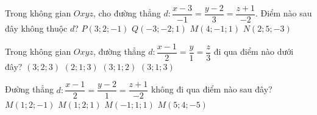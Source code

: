 \begin{ex}%
	Trong không gian $Oxyz$, cho đường thẳng $d\colon \dfrac{x-3}{-1}=\dfrac{y-2}{3}=\dfrac{z+1}{-2}$. Điểm nào sau đây không thuộc $d$?
	\choice
	{$ P\left(3;2;-1\right)$}
	{\True $Q\left(-3;-2;1\right)$}
	{$ M\left(4;-1;1\right)$}
	{$ N\left(2;5;-3\right)$}
\end{ex}

\begin{ex}%
	Trong không gian $ Oxyz$, đường thẳng $ d\colon \dfrac{x-1}{2}=\dfrac{y}{1}=\dfrac{z}{3}$ đi qua điểm nào dưới đây?
	\choice
	{$\left(3;2;3\right)$}
	{$\left(2;1;3\right)$}
	{$\left(3;1;2\right)$}
	{\True $\left(3;1;3\right)$}
\end{ex}

\begin{ex}%
	Đường thẳng $ d\colon \dfrac{x-1}{2}=\dfrac{y-2}{1}=\dfrac{z+1}{-2}$ không đi qua điểm nào sau đây?
	\choice
	{$ M\left(1;2;-1\right)$}
	{\True $ M\left(1;2;1\right)$}
	{$ M\left(-1;1;1\right)$}
	{$ M\left(5;4;-5\right)$}
	\end{ex}
	
